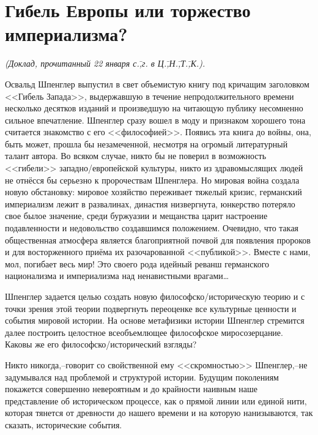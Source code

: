\newpage
\section*{Гибель Европы или торжество империализма?}
\label{sec:2}

\textit{(Доклад, прочитанный 22 января с.\=,г. в Ц.\=,Н.\=,Т.\=,К.).}

Освальд Шпенглер выпустил в свет объемистую книгу под кричащим заголовком <<Гибель Запада>>, выдержавшую в течение непродолжительного времени несколько десятков изданий и произведшую на читающую публику несомненно сильное впечатление. Шпенглер сразу вошел в моду и признаком хорошего тона считается знакомство с его <<философией>>. Появись эта книга до войны, она, быть может, прошла бы незамеченной, несмотря на огромый литературный талант автора. Во всяком случае, никто бы не поверил в возможность <<гибели>> западно\-/европейской культуры, никто из здравомыслящих людей не отнёсся бы серьезно к пророчествам Шпенглера. Но мировая война создала новую обстановку: мировое хозяйство переживает тяжелый кризис, германский империализм лежит в развалинах, династия низвергнута, юнкерство потеряло свое былое значение, среди буржуазии и мещанства царит настроение подавленности и недовольство создавшимся положением. Очевидно, что такая общественная атмосфера является благоприятной почвой для появления пророков и для восторженного приёма их разочарованной <<публикой>>. Вместе с нами, мол, погибает весь мир! Это своего рода идейный реванш германского национализма и империализма над ненавистными врагами\dots

Шпенглер задается целью создать новую философско\-/историческую теорию и с точки зрения этой теории подвергнуть переоценке все культурные ценности и события мировой истории. На основе метафизики истории Шпенглер стремится далее построить целостное всеобъемлющее философское миросозерцание. Каковы же его философско\-/исторический взгляды?

Никто никогда,\---говорит со свойственной ему <<скромностью>> Шпенглер,\---не задумывался над проблемой и структурой истории. Будущим поколениям покажется совершенно невероятным и до крайности наивным наше представление об историческом процессе, как о прямой линии или единой нити, которая тянется от древности до нашего времени и на которую нанизываются, так сказать, исторические события.

